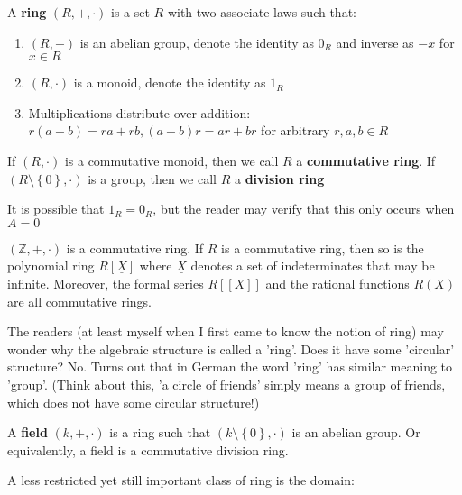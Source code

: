 \documentclass{note-eng}
\begin{document}
\begin{definition}
    A \textbf{ring} $(R, +, \cdot)$ is a set $R$ with two associate laws such that:
    \begin{enumerate}
        \item $(R, +)$ is an abelian group, denote the identity as $0_R$ and inverse as $-x$ for $x \in R$
        \item $(R, \cdot)$ is a monoid, denote the identity as $1_R$
        \item Multiplications distribute over addition: $r(a + b) = ra + rb, (a + b)r = ar + br$ for arbitrary $r, a, b \in R$
    \end{enumerate}
    If $(R, \cdot)$ is a commutative monoid, then we call $R$ a \textbf{commutative ring}. If $(R \setminus \left\lbrace 0 \right\rbrace, \cdot)$ is a group, then we call $R$ a \textbf{division ring}
\end{definition}

\begin{remark}
    It is possible that $1_R = 0_R$, but the reader may verify that this only occurs when $A = 0$
\end{remark}

\begin{example}
    $(\mathbb{Z}, +, \cdot)$ is a commutative ring. If $R$ is a commutative ring, then so is the polynomial ring $R[\underline{X}]$ where $\underline{X}$ denotes a set of indeterminates that may be infinite. Moreover, the formal series $R[[X]]$ and the rational functions $R(X)$ are all commutative rings.
\end{example}

The readers (at least myself when I first came to know the notion of ring) may wonder why the algebraic structure is called a 'ring'. Does it have some 'circular' structure? No. Turns out that in German the word 'ring' has similar meaning to 'group'. (Think about this, 'a circle of friends' simply means a group of friends, which does not have some circular structure!)

\begin{definition} [Field]
    A \textbf{field} $(k, +, \cdot)$ is a ring such that $(k \setminus \left\lbrace 0 \right\rbrace, \cdot)$ is an abelian group. Or equivalently, a field is a commutative division ring.
\end{definition}

\iffalse
A less restricted yet still important class of ring is the domain:
\end{document}
